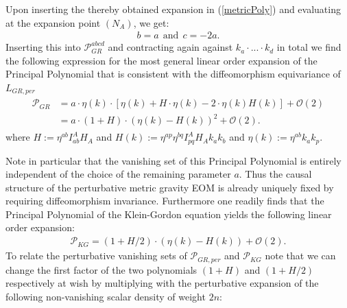 \documentclass[a4paper,12pt, DIV=14, BCOR=5mm, twoside, headsepline, numbers=noenddot]{scrbook}
\begin{document}
Upon inserting the thereby obtained expansion in (\ref{metricPoly}) and evaluating at the expansion point $(N_A)$, we get:
\begin{align}
    b = a \ \ \text{and} \ \ c = -2a.
\end{align}
Inserting this into $\mathcal{P}_{GR}^{abcd}$ and contracting again against $k_a\cdot ...\cdot k_d$ in total we find the following expression for the most general linear order expansion of the Principal Polynomial that is consistent with the diffeomorphism equivariance of $L_{GR,per}$
\begin{align}
\begin{aligned}
    \mathcal{P}_{GR} &= a \cdot  \eta(k) \cdot \left [\eta(k) + H \cdot \eta(k)  -
    2 \cdot  \eta(k) H(k) \right ] + \mathcal{O}(2)\\
    &= a \cdot (1 + H) \cdot (\eta(k) - H(k))^2 + \mathcal{O}(2).
\end{aligned}
\end{align}
where  $H:=\eta^{ab} I^A_{ab} H_{A}$ and $H(k) := \eta^{ap} \eta^{bq} I_{pq}^A H_A k_a k_b$ and $\eta(k) := \eta^{ab}k_a k_p$. 

Note in particular that the vanishing set of this Principal Polynomial is entirely independent of the choice of the remaining parameter $a$. Thus the causal structure of the perturbative metric gravity EOM is already uniquely fixed by requiring diffeomorphism invariance.
Furthermore one readily finds that the Principal Polynomial of the Klein-Gordon equation yields the following linear order expansion:
\begin{align}
    \mathcal{P}_{KG} = (1 + H/2) \cdot (\eta(k) - H(k)) + \mathcal{O}(2) .
\end{align}
To relate the perturbative vanishing sets of $\mathcal{P}_{GR,per}$ and $\mathcal{P}_{KG}$ note that we can change the first factor of the two polynomials $(1+H)$ and $(1+H/2)$ respectively at wish by multiplying with the perturbative expansion of the following non-vanishing scalar density of weight $2n$:
\end{document}
